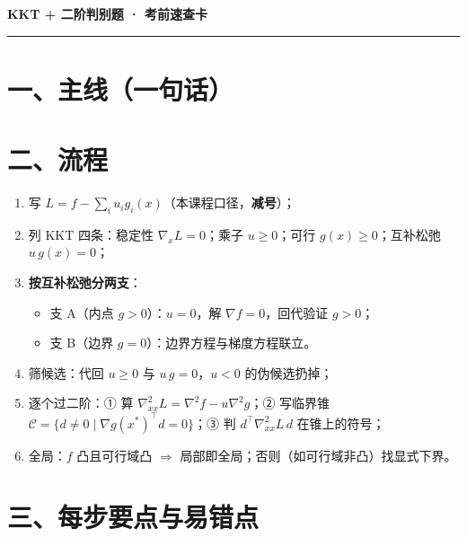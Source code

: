 \documentclass[11pt]{ctexart}
\begin{document}
\begin{center}\Large\bfseries KKT + 二阶判别题 · 考前速查卡\end{center}
\vspace{2pt}
\hrule
\vspace{4pt}

\section*{一、主线（一句话）}


\section*{二、流程}

\begin{enumerate}\setlength{\itemsep}{1pt}
\item 写 $L=f-\sum_i u_i g_i(x)$（本课程口径，\textbf{减号}）；
\item 列 KKT 四条：稳定性 $\nabla_x L=0$；乘子 $u\ge 0$；可行 $g(x)\ge 0$；互补松弛 $u\,g(x)=0$；
\item \textbf{按互补松弛分两支}：
  \begin{itemize}\setlength{\itemsep}{0pt}
  \item 支 A（内点 $g>0$）：$u=0$，解 $\nabla f=0$，回代验证 $g>0$；
  \item 支 B（边界 $g=0$）：边界方程与梯度方程联立。
  \end{itemize}
\item 筛候选：代回 $u\ge0$ 与 $u\,g=0$，$u<0$ 的伪候选扔掉；
\item 逐个过二阶：① 算 $\nabla^2_{xx}L=\nabla^2 f-u\nabla^2 g$；② 写临界锥 $\mathcal C=\{d\ne0\mid \nabla g(x^*)^\top d=0\}$；③ 判 $d^\top\nabla^2_{xx}L\,d$ 在锥上的符号；
\item 全局：$f$ 凸且可行域凸 $\Rightarrow$ 局部即全局；否则（如可行域非凸）找显式下界。
\end{enumerate}

\section*{三、每步要点与易错点}
\end{document}
